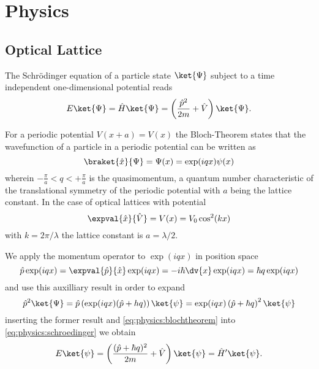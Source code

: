 \chapter{Physics}

\section{Optical Lattice}

The Schrödinger equation of a particle state $\ket{\Psi}$ subject to a time
independent one-dimensional potential reads
\begin{align}
  E\ket{\Psi}
  =\hat{H}\ket{\Psi}
  =\left(\frac{\hat{p}^2}{2m}+\hat{V}\right)\ket{\Psi}
  \label{eq:physics:schroedinger}.
\end{align}

For a periodic potential $V(x+a)=V(x)$ the Bloch-Theorem \cite{Ashcroft1976}
states that the wavefunction of a particle in a periodic potential can be
written as
\begin{equation}
  \braket{\hat{x}}{\Psi}
  =\Psi(x)
  =\exp(iqx)\psi(x)
  \label{eq:physics:blochtheorem}
\end{equation}
wherein $-\frac{\pi}{a}<q<+\frac{\pi}{a}$ is the quasimomentum, a quantum
number characteristic of the translational symmetry of the periodic potential
\cite[p. 42]{Lewenstein2012} with $a$ being the lattice constant. In the case
of optical lattices with potential
\begin{equation}
  \expval{\hat{x}}{\hat{V}}
  =V(x)
  =V_0\cos^2(kx)
  \label{eq:physics:pospotential}
\end{equation}
with $k=2\pi/\lambda$ the lattice constant is $a=\lambda/2$.

We apply the momentum operator to $\exp(iqx)$ in position space
\begin{equation*}
  \hat{p}\exp(iqx)
  =\expval{\hat{p}}{\hat{x}}\exp(iqx)
  =-i\hbar\dv{x}\exp(iqx)
  =\hbar q\exp(iqx)
\end{equation*}
and use this auxilliary result in order to expand
\begin{equation*}
  \hat{p}^2\ket{\Psi}
  =
  \hat{p}\left(\exp(iqx)(\hat{p}+hq)\right)\ket{\psi}
  =
  \exp(iqx)\left(\hat{p}+\hbar q\right)^2\ket{\psi}
\end{equation*}
inserting the former result and \cref{eq:physics:blochtheorem} into
\cref{eq:physics:schroedinger} we obtain
\begin{equation}
  E\ket{\psi}
  =\left(\frac{(\hat{p}+\hbar q)^2}{2m}+\hat{V}\right)\ket{\psi}
  =\hat{H}^\prime\ket{\psi}
  \label{eq:physics1}.
\end{equation}

